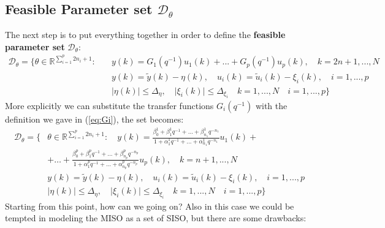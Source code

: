 \subsection{Feasible Parameter set $\mathcal{D}_\theta$}
The next step is to put everything together in order to define the \textbf{feasible parameter set} $\mathcal{D}_\theta$:
\begin{equation} \label{eq:FPS_1}
    \begin{aligned}
        \mathcal{D}_\theta = \big\{
            \theta\in\mathbb{R}^{\sum_{i=1}^p{2n_i+1}}: \quad  
            &y(k)=G_1(q^{-1})u_1(k)+...+G_p(q^{-1})u_p(k),  \quad k=2n+1,...,N\\
            &y(k)=\tilde{y}(k)-\eta(k), \quad
            u_i(k)=\tilde{u}_i(k)-\xi_i(k), \quad i=1,...,p\\
            &
            \vert \eta(k) \vert \le \Delta_\eta, \quad \vert \xi_i(k) \vert \le \Delta_{\xi_i} \quad k=1,...,N \quad i=1,...,p
        \big\}
    \end{aligned}
\end{equation}
More explicitly we can substitute the transfer functions $G_i(q^{-1})$ with the definition we gave in (\ref{eq:Gi}), the set becomes:
\begin{equation}
    \begin{aligned}\label{eq:FPS_MIMO2}
        \mathcal{D}_\theta = \big\{
            &\theta\in\mathbb{R}^{\sum_{i=1}^p{2n_i+1}}: \quad
            y(k)={
                \frac{
                    \beta_0^1+\beta_1^1{q^{-1}}+...+\beta_{n_1}^1{q^{-n_1}}
                }{1+\alpha_1^1{q^{-1}}+...+\alpha_{n_1}^1{q^{-n_1}}
                }
            }u_1(k)+\\
            &+\dots
            +{
                \frac{
                    \beta_0^p+\beta_1^p{q^{-1}}+...+\beta_{n_p}^p{q^{-n_p}}
                }{1+\alpha_1^p{q^{-1}}+...+\alpha_{n_p}^p{q^{-n_p}}
                }
            }u_p(k),  \quad k=n+1,...,N\\
            &y(k)=\tilde{y}(k)-\eta(k), \quad
            u_i(k)=\tilde{u}_i(k)-\xi_i(k), \quad i=1,...,p\\
            &
            \vert \eta(k) \vert \le \Delta_\eta, \quad \vert \xi_i(k) \vert \le \Delta_{\xi_i} \quad k=1,...,N \quad i=1,...,p
        \big\}
    \end{aligned}
\end{equation} 
Starting from this point, how can we going on? Also in this case we could be tempted in modeling the MISO as a set of SISO, but there are some drawbacks: 
